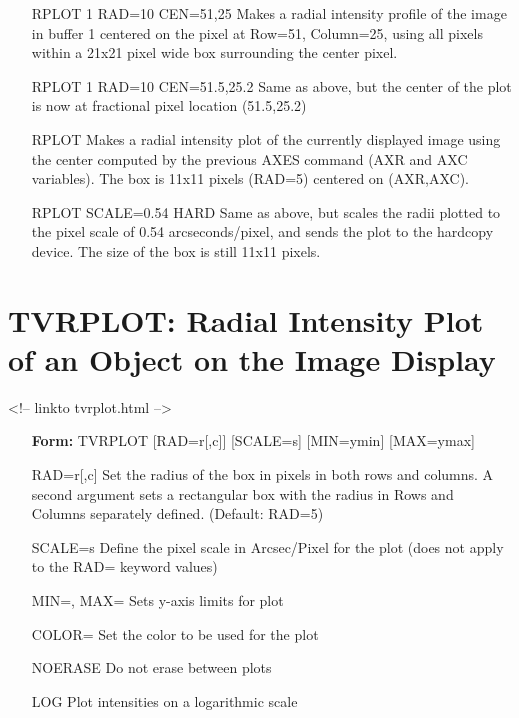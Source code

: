 \begin{itemize}
  \item[RPLOT 1 RAD=10 CEN=51,25\hfill]{
   Makes a radial intensity profile of the image in buffer 1 centered on
   the pixel at Row=51, Column=25, using all pixels within a 21x21 pixel
   wide box surrounding the center pixel.}
  \item[RPLOT 1 RAD=10 CEN=51.5,25.2\hfill]{
   Same as above, but the center of the plot is now at fractional pixel
   location (51.5,25.2)}
  \item[RPLOT\hfill]{
   Makes a radial intensity plot of the currently displayed image using
   the center computed by the previous AXES command (AXR and AXC variables).
   The box is 11x11 pixels (RAD=5) centered on (AXR,AXC).}
  \item[RPLOT SCALE=0.54 HARD\hfill]{
   Same as above, but scales the radii plotted to the pixel scale of 0.54
   arcseconds/pixel, and sends the plot to the hardcopy device.  The size
   of the box is still 11x11 pixels.}
\end{itemize}

\section{TVRPLOT: Radial Intensity Plot of an Object on the Image Display}
\begin{rawhtml}
<!-- linkto tvrplot.html -->
\end{rawhtml}
\begin{itemize}
  \item[\textbf{Form: } TVRPLOT {[RAD=r{[,c]}]} {[SCALE=s]} {[MIN=ymin]} 
       {[MAX=ymax]}\hfill]{}
  \item[RAD=r{[,c]}]{ Set the radius of the box in pixels in both rows 
       and columns.  A second argument sets a rectangular 
       box with the radius in Rows and Columns separately 
       defined.  (Default: RAD=5)}
  \item[SCALE=s]{   Define the pixel scale in Arcsec/Pixel for the plot
       (does not apply to the RAD= keyword values)}
  \item[MIN=, MAX=]{ Sets y-axis limits for plot}
  \item[COLOR=]{ Set the color to be used for the plot}
  \item[NOERASE]{ Do not erase between plots}
  \item[LOG]{ Plot intensities on a logarithmic scale}
\end{itemize}

